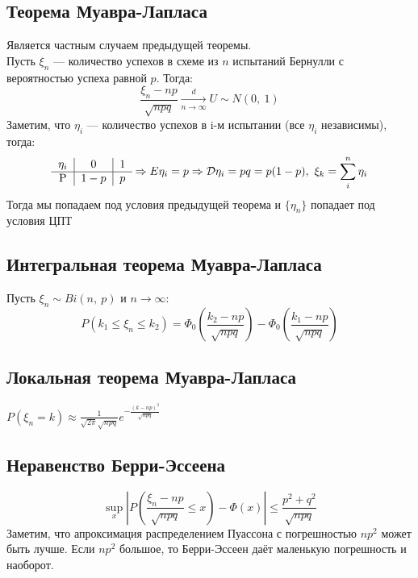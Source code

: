 \documentclass[12pt, a4paper]{article}
\begin{document}
    \subsection*{Теорема Муавра-Лапласа}
    Является частным случаем предыдущей теоремы.\\
    Пусть $\xi_n$ --- количество успехов в схеме из $n$ испытаний Бернулли с вероятностью успеха равной $p$. Тогда:
    \[\frac{\xi_n - np}{\sqrt{npq}} \xrightarrow[n\to \infty]{d} U\sim N(0,\ 1)\]
    Заметим, что $\eta_i$ --- количество успехов в i-м испытании (все $\eta_i$ независимы), тогда:
    \[\begin{tabular}{c|c|c}
        $\eta_i$ & 0 & 1\\
        \hline
        P & $1-p$ & $p$
    \end{tabular}\Rightarrow E\eta_i = p\Rightarrow \mathcal{D}\eta_i = pq = p(1 - p),\ \xi_k = \sum_i^n \eta_i\]
    Тогда мы попадаем под условия предыдущей теорема и $\{\eta_n\}$ попадает под условия ЦПТ
    \subsection*{Интегральная теорема Муавра-Лапласа}
    Пусть $\xi_n \sim Bi(n,\ p)$ и $n\to \infty$:
    \[P(k_1 \leq \xi_n\leq k_2) = \Phi_0\left(\frac{k_2 - np}{\sqrt{npq}}\right) - \Phi_0\left(\frac{k_1 - np}{\sqrt{npq}}\right)\]
    \subsection*{Локальная теорема Муавра-Лапласа}
    $P(\xi_n = k)\approx \frac{1}{\sqrt{2\pi}\sqrt{npq}}e^{-\frac{(k - np)^2}{\sqrt{npq}}}$
    \subsection*{Неравенство  Берри-Эссеена}
    \[\sup\limits_x \left| P\left( \frac{\xi_n - np}{\sqrt{npq}} \leq x\right) - \Phi(x)\right| \leq \frac{p^2 + q^2}{\sqrt{npq}}\]
    Заметим, что апроксимация распределением Пуассона с погрешностью $np^2$ может быть лучше. Если $np^2$ большое, то Берри-Эссеен даёт маленькую погрешность и наоборот.
\end{document}
